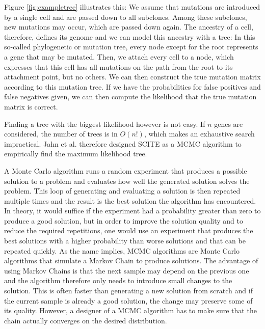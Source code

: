 Figure \ref{fig:exampletree} illustrates this: We assume that mutations are introduced by a single cell and are passed down to all subclones. Among these subclones, new mutations may occur, which are passed down again. The ancestry of a cell, therefore, defines its genome and we can model this ancestry with a tree: In this so-called phylogenetic or mutation tree, every node except for the root represents a gene that may be mutated. Then, we attach every cell to a node, which expresses that this cell has all mutations on the path from the root to its attachment point, but no others. We can then construct the true mutation matrix according to this mutation tree. If we have the probabilities for false positives and false negatives given, we can then compute the likelihood that the true mutation matrix is correct. 


Finding a tree with the biggest likelihood however is not easy. If $n$ genes are considered, the number of trees is in $O(n!)$, which makes an exhaustive search impractical. Jahn et al. therefore designed \ac{SCITE} as a \ac{MCMC} algorithm to empirically find the maximum likelihood tree.


A Monte Carlo algorithm runs a random experiment that produces a possible solution to a problem and evaluates how well the generated solution solves the problem. This loop of generating and evaluating a solution is then repeated multiple times and the result is the best solution the algorithm has encountered. In theory, it would suffice if the experiment had a probability greater than zero to produce a good solution, but in order to improve the solution quality and to reduce the required repetitions, one would use an experiment that produces the best solutions with a higher probability than worse solutions and that can be repeated quickly. As the name implies, \ac{MCMC} algorithms are Monte Carlo algorithms that simulate a Markov Chain to produce solutions. The advantage of using Markov Chains is that the next sample may depend on the previous one and the algorithm therefore only needs to introduce small changes to the solution. This is often faster than generating a new solution from scratch and if the current sample is already a good solution, the change may preserve some of its quality. However, a designer of a \ac{MCMC} algorithm has to make sure that the chain actually converges on the desired distribution.